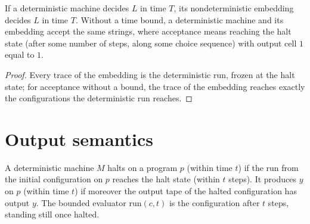 \begin{lemma}
  \label{lem:models-to-ntm}
  \leanok
  If a deterministic machine decides $L$ in time $T$, its nondeterministic
  embedding decides $L$ in time $T$. Without a time bound, a deterministic
  machine and its embedding accept the same strings, where acceptance means
  reaching the halt state (after some number of steps, along some choice
  sequence) with output cell $1$ equal to $1$.
\end{lemma}
\begin{proof}
  \leanok
  Every trace of the embedding is the deterministic run, frozen at the halt
  state; for acceptance without a bound, the trace of the embedding reaches
  exactly the configurations the deterministic run reaches.
\end{proof}

\section{Output semantics}

\begin{definition}
  \label{def:produces}
  \leanok
  A deterministic machine $M$ halts on a program $p$ (within time $t$) if the
  run from the initial configuration on $p$ reaches the halt state (within $t$
  steps). It produces $y$ on $p$ (within time $t$) if moreover the output tape of
  the halted configuration has output $y$. The bounded evaluator
  $\mathrm{run}(c, t)$ is the configuration after $t$ steps, standing still once
  halted.
\end{definition}

